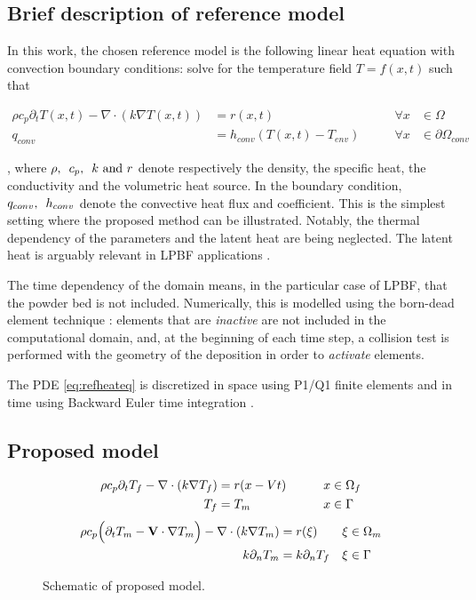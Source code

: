 \subsection{Brief description of reference model}

In this work, the chosen reference model is
the following linear heat equation with convection
boundary conditions: solve for the temperature
field $T = f(x,t)$ such that

\begin{align}
  \rho c_p \partial_t T{\scriptstyle(x,t)} - \nabla \cdot (k \nabla T{\scriptstyle(x,t)}) &= r{\scriptstyle(x,t)}
  \qquad &\forall x &\in \Omega \label{eq:refheateq}\\
  q_{conv} &= h_{conv} ( T{\scriptstyle(x,t)} - T_{env} ) \qquad & \forall x &\in \partial \Omega {}_{conv}
\end{align}

, where $\rho, \enskip c_p, \enskip k \textrm{ and } r$
denote respectively
the density, the specific heat, the conductivity and the volumetric
heat source. In the boundary condition,
$q_{conv}, \enskip h_{conv}$ denote the convective heat flux
and coefficient.
This is the simplest setting where
the proposed method can be illustrated.
Notably, the thermal dependency of the parameters
and the latent heat are being neglected. The latent heat is
arguably relevant in LPBF applications
\cite{VanElsen2007, Hodge2021}.\par

The time dependency of the domain means, in the particular case
of LPBF, 
that the powder bed is not included.
Numerically, this is modelled
using  the born-dead element technique \cite{Chiumenti2010}:
elements that are \textit{inactive} are not included in the
computational domain,
and, at the beginning of each time step, a collision test
is performed with the geometry of the deposition
in order to \textit{activate} elements.\par

The PDE \ref{eq:refheateq} is discretized in space using P1/Q1
finite elements and in time using Backward Euler time integration
\cite{Puso2023}.\par

\subsection{Proposed model}


\begin{align}
  \label{eq:pdeddf}
  \rho c_p \partial_t T_f - \nabla \cdot (k \nabla T_f) &= r(x - Vt) \qquad &x &\in \Omega_f\\
  T_f &= T_m \qquad &x &\in \Gamma \notag
\end{align}
\begin{align}
  \label{eq:pdeddm}
  \rho c_p \Big( \partial_t T_m - \mathbf{V} \cdot \nabla T_m \Big) -
  \nabla \cdot ( k \nabla T_m) &= r(\xi)  &\xi &\in \Omega_m\\
  k \partial_n T_m &= k \partial_n T_f  &\xi &\in \Gamma \notag
\end{align}

\begin{figure}
  \caption{Schematic of proposed model.}
  \label{fig:schematic}
\end{figure}


\iffalse
Show reference model
Go over limitations
Introduce my model
\fi
